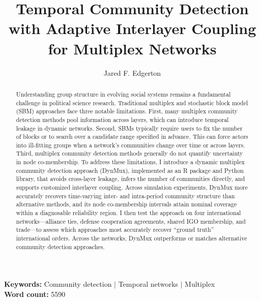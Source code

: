 \documentclass[11pt, letterpaper]{article}
\begin{document}
\begin{titlingpage}
\thispagestyle{empty}
\clearpage\thispagestyle{empty}
\clearpage
\renewcommand{\abstractname}{} %
\renewcommand{\absnamepos}{empty} %
\title{Temporal Community Detection with Adaptive Interlayer Coupling for Multiplex Networks}\bigskip
\author{Jared F. Edgerton}
\clearpage\maketitle

\begin{abstract}
\noindent Understanding group structure in evolving social systems remains a fundamental challenge in political science research. Traditional multiplex and stochastic block model (SBM) approaches face three notable limitations. First, many multiplex community detection methods pool information across layers, which can introduce temporal leakage in dynamic networks. Second, SBMs typically require users to fix the number of blocks or to search over a candidate range specified in advance. This can force actors into ill-fitting groups when a network's communities change over time or across layers. Third, multiplex community detection methods generally do not quantify uncertainty in node co-membership. To address these limitations, I introduce a dynamic multiplex community detection approach (DynMux), implemented as an R package and Python library, that avoids cross-layer leakage, infers the number of communities directly, and supports customized interlayer coupling. Across simulation experiments, DynMux more accurately recovers time-varying inter- and intra-period community structure than alternative methods, and its node co-membership intervals attain nominal coverage within a diagnosable reliability region. I then test the approach on four international networks---alliance ties, defense cooperation agreements, shared IGO membership, and trade---to assess which approaches most accurately recover “ground truth” international orders. Across the networks, DynMux outperforms or matches alternative community detection approaches. 
\end{abstract}

\begin{center}
\textbf{Keywords:} Community detection $|$ Temporal networks $|$ Multiplex \\
\textbf{Word count:} 5590
\end{center}
\end{titlingpage}
\end{document}
